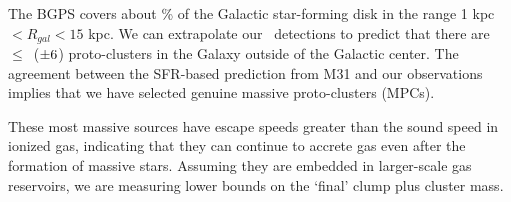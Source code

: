 The BGPS covers about \obsfrac\% of the Galactic star-forming disk in the range
1 kpc $< R_{gal}<15$ kpc.  We can extrapolate our \nMPC\ detections to predict
that there are $\leq$\nMPCtot\ ($\pm 6$) proto-clusters in the Galaxy
outside of the Galactic center.
The agreement between the SFR-based prediction
from M31 and our observations implies that we have selected genuine massive
proto-clusters (MPCs).  

These most massive sources have escape speeds greater than the sound speed in
ionized gas, indicating that they can continue to accrete gas even after the
formation of massive stars.  Assuming they are embedded in larger-scale gas
reservoirs, we are measuring lower bounds on the `final' clump plus cluster
mass. 




